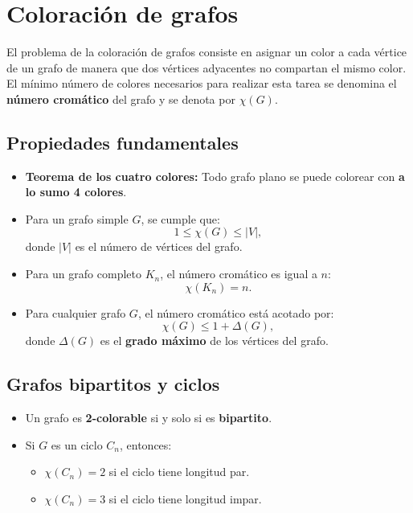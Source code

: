 \documentclass{article}
\begin{document}
\newpage

\section{Coloración de grafos}

El problema de la coloración de grafos consiste en asignar un color a cada vértice de un grafo de manera que dos vértices adyacentes no compartan el mismo color. El mínimo número de colores necesarios para realizar esta tarea se denomina el \textbf{número cromático} del grafo y se denota por $\chi(G)$.

\subsection{Propiedades fundamentales}
\begin{itemize}
    \item \textbf{Teorema de los cuatro colores:} Todo grafo plano se puede colorear con \textbf{a lo sumo 4 colores}.
    \item Para un grafo simple $G$, se cumple que:
    \begin{equation}
        1 \leq \chi(G) \leq |V|,
    \end{equation}
    donde $|V|$ es el número de vértices del grafo.
    \item Para un grafo completo $K_n$, el número cromático es igual a $n$: \[\chi(K_n) = n.\]
    \item Para cualquier grafo $G$, el número cromático está acotado por:
    \begin{equation}
        \chi(G) \leq 1 + \Delta(G),
    \end{equation}
    donde $\Delta(G)$ es el \textbf{grado máximo} de los vértices del grafo.
\end{itemize}

\subsection{Grafos bipartitos y ciclos}
\begin{itemize}
    \item Un grafo es \textbf{2-colorable} si y solo si es \textbf{bipartito}.
    \item Si $G$ es un ciclo $C_n$, entonces:
    \begin{itemize}
        \item $\chi(C_n) = 2$ si el ciclo tiene longitud par.
        \item $\chi(C_n) = 3$ si el ciclo tiene longitud impar.
    \end{itemize}
\end{itemize}
\end{document}
